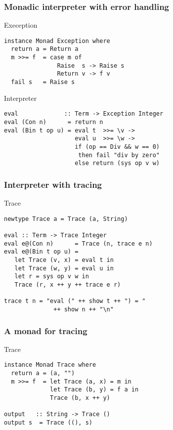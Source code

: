 \documentclass{beamer}
\begin{document}
\begin{frame}[fragile]
  \frametitle{Monadic interpreter with error handling}
  \begin{alertblock}{Exeception}
\begin{lstlisting}
instance Monad Exception where
  return a = Return a
  m >>= f  = case m of 
               Raise  s -> Raise s
               Return v -> f v
  fail s   = Raise s
\end{lstlisting}  
\end{alertblock}

\begin{exampleblock}{Interpreter}
\begin{lstlisting}
eval             :: Term -> Exception Integer
eval (Con n)      = return n
eval (Bin t op u) = eval t  >>= \v ->
                    eval u  >>= \w ->
                    if (op == Div && w == 0) 
                     then fail "div by zero"
                    else return (sys op v w)
\end{lstlisting}  
\end{exampleblock}
\end{frame}             

\begin{frame}[fragile]
  \frametitle{Interpreter with tracing}
  \begin{block}{Trace}
\begin{lstlisting}
newtype Trace a = Trace (a, String)

eval :: Term -> Trace Integer
eval e@(Con n)      = Trace (n, trace e n)
eval e@(Bin t op u) = 
   let Trace (v, x) = eval t in
   let Trace (w, y) = eval u in
   let r = sys op v w in
   Trace (r, x ++ y ++ trace e r)

trace t n = "eval (" ++ show t ++ ") = "
              ++ show n ++ "\n"
\end{lstlisting}  
\end{block}
\end{frame}


\begin{frame}[fragile]
  \frametitle{A monad for tracing}
  \begin{alertblock}{Trace}
\begin{lstlisting}
instance Monad Trace where
  return a = (a, "")
  m >>= f  = let Trace (a, x) = m in
             let Trace (b, y) = f a in
             Trace (b, x ++ y)

output   :: String -> Trace ()
output s  = Trace ((), s)
\end{lstlisting}  
\end{alertblock}
\end{frame}
\end{document}
